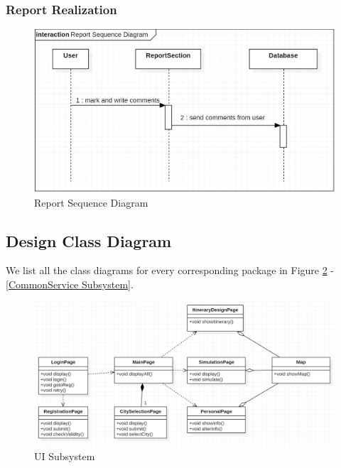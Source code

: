 \documentclass[10pt]{article}
\begin{document}
\subsubsection{Report Realization}
\begin{figure}[H]
    \centering
    
    \includegraphics[width=14cm]{report.jpg}
    \caption{Report Sequence Diagram}
    \label{Report Sequence Diagram}
\end{figure}

\subsection{Design Class Diagram}
We list all the class diagrams for every corresponding package in Figure \ref{UI Subsystem} -\ref{CommonService Subsystem}.

\begin{figure}[H]
    \centering
    
    \includegraphics[width=14cm]{ui.png}
    \caption{UI Subsystem}
    \label{UI Subsystem}
\end{figure}
\end{document}
